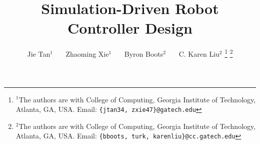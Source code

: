 \documentclass[letterpaper, 10 pt, conference]{ieeeconf}  %
\title{\LARGE \bf
Simulation-Driven Robot Controller Design
}
\author{Jie Tan$^{1}$ ~~~Zhaoming Xie$^{1}$ ~~~Byron Boots$^{2}$
  ~~~C. Karen Liu$^{2}$%
\thanks{$^{1}$The authors are with College of Computing, Georgia Institute of Technology, Atlanta, GA, USA. Email:
        {\tt\small \{jtan34, zxie47\}@gatech.edu}}%
\thanks{$^{2}$The authors are with College of Computing, Georgia Institute of Technology, Atlanta, GA, USA. Email:
        {\tt\small \{bboots, turk, karenliu\}@cc.gatech.edu}}%
}
\begin{document}
\maketitle
\thispagestyle{empty}
\pagestyle{empty}


\begin{abstract}

\end{abstract}











\appendix

\end{document}

